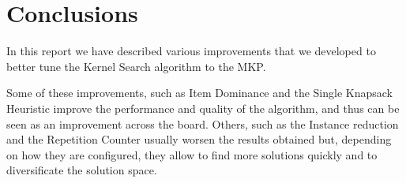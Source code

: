 \chapter{Conclusions}
In this report we have described various improvements that we developed to
better tune the Kernel Search algorithm to the MKP\@.

Some of these improvements, such as Item Dominance and the Single Knapsack Heuristic
improve the performance and quality of the algorithm,
and thus can be seen as an improvement across the board.
Others, such as the Instance reduction and the Repetition Counter
usually worsen the results obtained but, depending on how they are configured,
they allow to find more solutions quickly and to diversificate the solution space.

